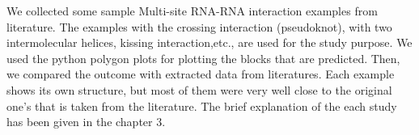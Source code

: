 \documentclass[twoside,a4paper]{report}
\numberwithin{equation}{section}
\begin{document}
	  We collected some sample Multi-site RNA-RNA interaction examples from literature. The examples with the crossing interaction (pseudoknot), with two intermolecular helices, kissing interaction,etc., are used for the study purpose. We used the python polygon plots for plotting the blocks that are predicted. Then, we compared the outcome with extracted data from literatures. Each example shows its own structure, but most of them were very well close to the original one's that is taken from the literature. The brief explanation of the each study has been given in the chapter 3. \\ 
	  
	  
	
	
	
	
	
	
	
\end{document}

